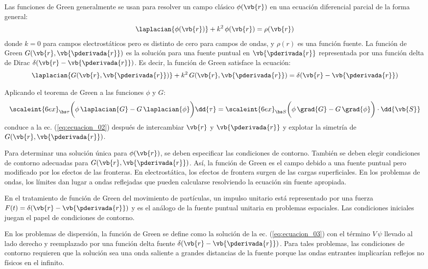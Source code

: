 \begin{tcolorbox}[breakable, title={\centering Cuadro 2. Funciones de Green, Funciones Delta y Condiciones de Frontera.}]

Las funciones de Green generalmente se usan para resolver un campo clásico $\phi (\vb{r})$ en una ecuación diferencial parcial de la forma general:
\begin{align*}
\laplacian{\phi (\vb{r})} + k^{2} \, \phi (\vb{r}) = \rho (\vb{r})
\end{align*}
donde $k = 0$ para campos electrostáticos pero es distinto de cero para campos de ondas, y $\rho (r)$ es una función fuente. La función de Green $G (\vb{r}, \vb{\pderivada{r}})$ es la solución para una fuente puntual en $\vb{\pderivada{r}}$ representada por una función delta de Dirac $\delta (\vb{r} - \vb{\pderivada{r}})$. Es decir, la función de Green satisface la ecuación:
\begin{align*}
\laplacian{G (\vb{r}, \vb{\pderivada{r}})} + k^{2} \, G (\vb{r}, \vb{\pderivada{r}}) = \delta (\vb{r} - \vb{\pderivada{r}})
\end{align*}

Aplicando el teorema de Green a las funciones $\phi$ y $G$:
\begin{align*}
\scaleint{6ex}_{\bs \tau} \bigg( \phi \, \laplacian{G} - G \, \laplacian{\phi} \bigg) \dd{\tau} = \scaleint{6ex}_{\bs S} \bigg( \phi \, \grad{G} -  G \, \grad{\phi} \bigg) \cdot \dd{\vb{S}}
\end{align*}
conduce a la ec. (\ref{eq:ecuacion_02}) después de intercambiar $\vb{r}$ y $\vb{\pderivada{r}}$ y explotar la simetría de $G (\vb{r}, \vb{\pderivada{r}})$.
\par
Para determinar una solución única para $\phi (\vb{r})$, se deben especificar las condiciones de contorno. También se deben elegir condiciones de contorno adecuadas para $G (\vb{r}, \vb{\pderivada{r}})$. Así, la función de Green es el campo debido a una fuente puntual pero modificado por los efectos de las fronteras. En electrostática, los efectos de frontera surgen de las cargas superficiales. En los problemas de ondas, los límites dan lugar a ondas reflejadas que pueden calcularse resolviendo la ecuación sin fuente apropiada.
\par
En el tratamiento de función de Green del movimiento de partículas, un impulso unitario está representado por una fuerza $F (t) = \delta (\vb{r} - \vb{\pderivada{r}})$ y es el análogo de la fuente puntual unitaria en problemas espaciales. Las condiciones iniciales juegan el papel de condiciones de contorno.
\par
En los problemas de dispersión, la función de Green se define como la solución de la ec. (\ref{eq:ecuacion_03}) con el término $V \, \psi$ llevado al lado derecho y reemplazado por una función delta fuente $\delta (\vb{r} - \vb{\pderivada{r}})$. Para tales problemas, las condiciones de contorno requieren que la solución sea una onda saliente a grandes distancias de la fuente porque las ondas entrantes implicarían reflejos no físicos en el infinito.
\end{tcolorbox}

